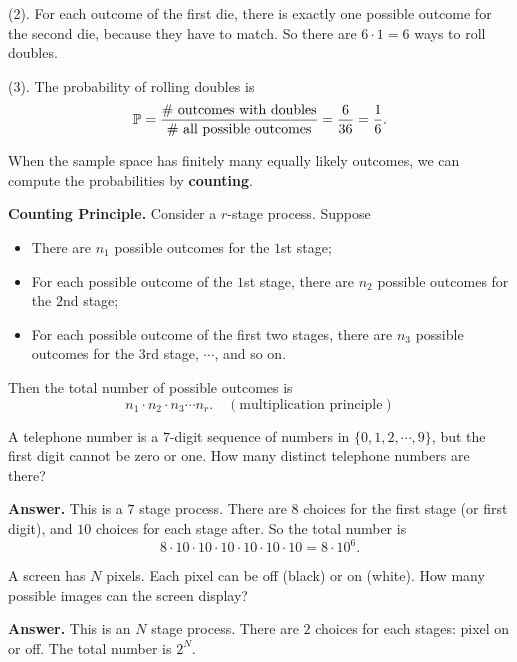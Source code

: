   (2). For each outcome of the first die, there is exactly one possible outcome
  for the second die, because they have to match. So there are $6\cdot 1 = 6$
  ways to roll doubles.
  

  (3). The probability of rolling doubles is
  \[
    \mathbb{P} = \frac{\# ~\text{outcomes with doubles}}{\#~\text{all possible
        outcomes}} = \frac{6}{36} = \frac{1}{6}.
  \]

  \begin{remark}
    When the sample space has finitely many equally likely outcomes, we can
    compute the probabilities by \textbf{counting}.
  \end{remark}

  \textbf{Counting Principle.}  Consider a $r$-stage process. Suppose
  \begin{itemize}
  \item There are $n_1$ possible outcomes for the $1$st stage;
  \item For each possible outcome of the $1$st stage, there are $n_2$ possible
    outcomes for the $2$nd stage;
  \item For each possible outcome of the first two stages, there are $n_3$
    possible outcomes for the $3$rd stage, $\cdots$, and so on.
  \end{itemize}
  Then the total number of possible outcomes is
  \[
    n_1\cdot n_2\cdot n_3\cdots n_r.\quad(\text{multiplication principle})
  \]

  \begin{example}
    A telephone number is a $7$-digit sequence of numbers in $\{0,1,2,\cdots,
    9\}$, but the first digit cannot be zero or one. How many distinct telephone
    numbers are there?
  \end{example}

  \textbf{Answer.} This is a $7$ stage process. There are $8$ choices for the
  first stage (or first digit), and $10$ choices for each stage after. So the
  total number is
  \[
    8\cdot 10\cdot 10\cdot 10\cdot 10\cdot 10\cdot 10 = 8\cdot 10^6.
  \]

  \begin{example}
    A screen has $N$ pixels. Each pixel can be off (black) or on (white). How
    many possible images can the screen display?
  \end{example}

  \textbf{Answer.} This is an $N$ stage process. There are $2$ choices for each
  stages: pixel on or off. The total number is $2^N$.


